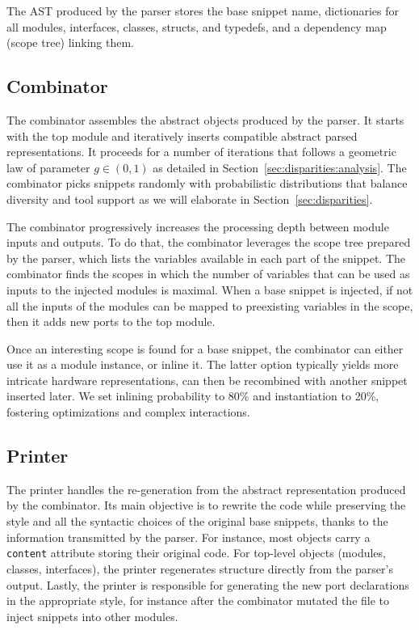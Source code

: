 The AST produced by the parser stores the base snippet name, dictionaries for all modules, interfaces, classes, structs, and typedefs, and a dependency map (scope tree) linking them.

\subsection{Combinator}
\label{sec:complex-code:combinator}

The combinator assembles the abstract objects produced by the parser.
It starts with the top module and iteratively inserts compatible abstract parsed representations.
It proceeds for a number of iterations that follows a geometric law of parameter $g \in (0,1)$ as detailed in Section~\ref{sec:disparities:analysis}.
The combinator picks snippets randomly with probabilistic distributions that balance diversity and tool support as we will elaborate in Section~\ref{sec:disparities}.

The combinator progressively increases the processing depth between module inputs and outputs.
To do that, the combinator leverages the scope tree prepared by the parser, which lists the variables available in each part of the snippet.
The combinator finds the scopes in which the number of variables that can be used as inputs to the injected modules is maximal.
When a base snippet is injected, if not all the inputs of the modules can be mapped
to preexisting variables in the scope, then it adds new ports to the top module.

Once an interesting scope is found for a base snippet, the combinator can either use it as a module instance, or inline it.
The latter option typically yields more intricate hardware representations, can then be recombined with another snippet inserted later.
We set inlining probability to 80\% and instantiation to 20\%, fostering optimizations and complex interactions.

\subsection{Printer}
\label{sec:complex-code:printer}

The printer handles the re-generation from the abstract representation produced by the combinator.
Its main objective is to rewrite the code while preserving the style and all the syntactic choices of the original base snippets, thanks to the information transmitted by the parser.
For instance, most objects carry a \texttt{content} attribute storing their original code.
For top-level objects (modules, classes, interfaces), the printer regenerates structure directly from the parser's output.
Lastly, the printer is responsible for generating the new port declarations in the appropriate style, for instance after the combinator mutated the file to inject snippets into other modules.


